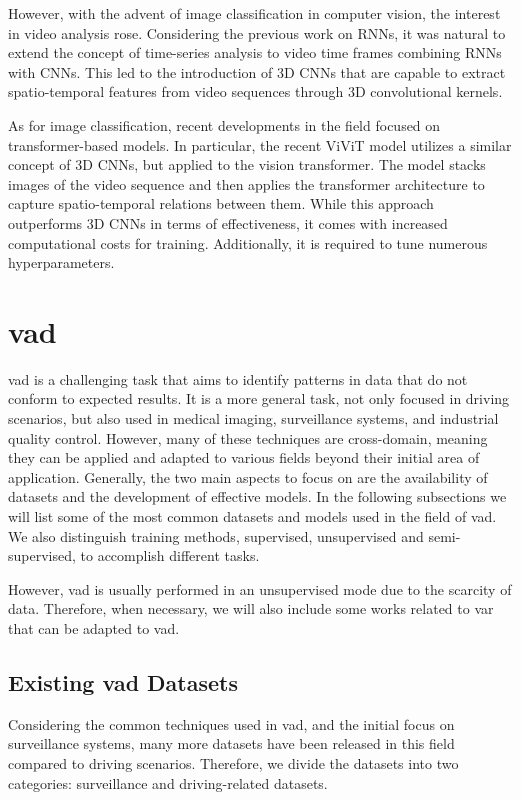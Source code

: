 However, with the advent of image classification in computer vision, 
the interest in video analysis rose. Considering the previous work on RNNs, 
it was natural to extend the concept of time-series analysis to video time 
frames combining RNNs with CNNs. This led to the introduction of 3D CNNs that 
are capable to extract spatio-temporal features from video sequences through 
3D convolutional kernels.

As for image classification, recent developments in the field focused on 
transformer-based models. In particular, the recent ViViT model \cite{vivit} 
utilizes a similar concept of 3D CNNs, but applied to the vision transformer. 
The model stacks images of the video sequence and then applies the transformer 
architecture to capture spatio-temporal relations between them. 
While this approach outperforms 3D CNNs in terms of effectiveness, it comes with 
increased computational costs for training. Additionally, it is required to 
tune numerous hyperparameters.

\section{\acl{vad}}
\ac{vad} is a challenging task that aims to 
identify patterns in data that do not conform to expected results. It is a 
more general task, not only focused in driving scenarios, but also used in 
medical imaging, surveillance systems, and industrial quality control.
However, many of these techniques are cross-domain, meaning they can be applied and 
adapted to various fields beyond their initial area of application.
Generally, the two main aspects to focus on are the availability 
of datasets and the development of effective models. In the following subsections
we will list some of the most common datasets and models used in the field of 
\ac{vad}. We also distinguish training methods, supervised, unsupervised and 
semi-supervised, to accomplish different tasks.

However, \ac{vad} is usually performed in an unsupervised mode due to the 
scarcity of data. Therefore, when necessary, we will also include some works 
related to \ac{var} that can be adapted to \ac{vad}.

\subsection{Existing \acs{vad} Datasets}
Considering the common techniques used in \ac{vad}, and the initial focus 
on surveillance systems, many more datasets have been released in this field 
compared to driving scenarios. Therefore, we divide the datasets into 
two categories: surveillance and driving-related datasets.

